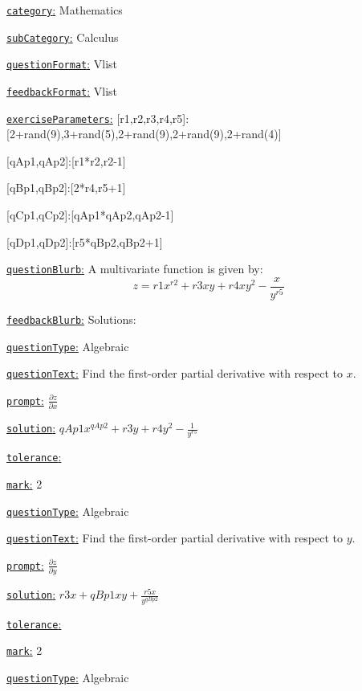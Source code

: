 \documentclass[preview]{standalone}
\newcommand \fieldname[1]{\underline{\texttt{#1}:}}
\begin{document}
\fieldname{category}  %
Mathematics

\fieldname{subCategory} %
Calculus

\fieldname{questionFormat}
Vlist

\fieldname{feedbackFormat}
Vlist

\fieldname{exerciseParameters}
[r1,r2,r3,r4,r5]:[2+rand(9),3+rand(5),2+rand(9),2+rand(9),2+rand(4)]

[qAp1,qAp2]:[r1*r2,r2-1]

[qBp1,qBp2]:[2*r4,r5+1]

[qCp1,qCp2]:[qAp1*qAp2,qAp2-1]

[qDp1,qDp2]:[r5*qBp2,qBp2+1]

\fieldname{questionBlurb}
A multivariate function is given by:
\[
z = {r1}x^{r2} + {r3}xy + {r4}xy^2 - \frac{x}{y^{r5}}
\]

\fieldname{feedbackBlurb}
Solutions:

\fieldname{questionType}
Algebraic

\fieldname{questionText}
Find the first-order partial derivative with respect to $x$.

\fieldname{prompt}
$\frac{\partial z}{\partial x}$

\fieldname{solution}
${qAp1}x^{qAp2} + {r3}y + {r4}y^2 - \frac{1}{y^{r5}}$

\fieldname{tolerance}


\fieldname{mark}
2

\fieldname{questionType}
Algebraic

\fieldname{questionText}
Find the first-order partial derivative with respect to $y$.

\fieldname{prompt}
$\frac{\partial z}{\partial y}$

\fieldname{solution}
${r3}x + {qBp1}xy + \frac{{r5}x}{y^{qBp2}}$

\fieldname{tolerance}


\fieldname{mark}
2

\fieldname{questionType}
Algebraic
\end{document}

